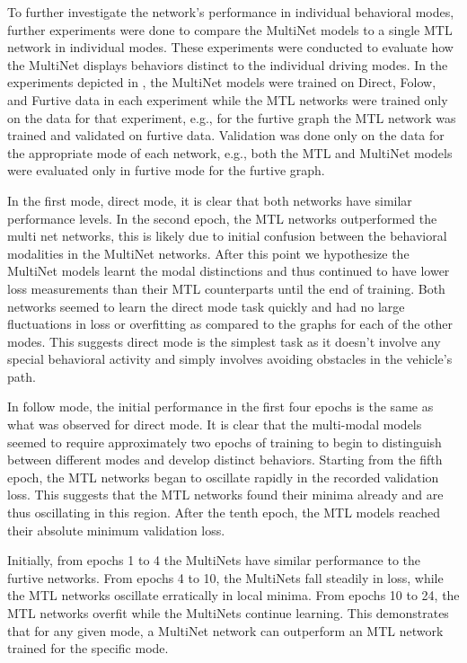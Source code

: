To further investigate the network's performance in individual behavioral modes, further experiments were done to compare the MultiNet models to a single MTL network in individual modes. These experiments were conducted to evaluate how the MultiNet displays behaviors distinct to the individual driving modes. In the experiments depicted in , the MultiNet models were trained on Direct, Folow, and Furtive data in each experiment while the MTL networks were trained only on the data for that experiment, e.g., for the furtive graph the MTL network was trained and validated on furtive data. Validation was done only on the data for the appropriate mode of each network, e.g., both the MTL and MultiNet models were evaluated only in furtive mode for the furtive graph.

In the first mode, direct mode, it is clear that both networks have similar performance levels. In the second epoch, the MTL networks outperformed the multi net networks, this is likely due to initial confusion between the behavioral modalities in the MultiNet networks. After this point we hypothesize the MultiNet models learnt the modal distinctions and thus continued to have lower loss measurements than their MTL counterparts until the end of training. Both networks seemed to learn the direct mode task quickly and had no large fluctuations in loss or overfitting as compared to the graphs for each of the other modes. This suggests direct mode is the simplest task as it doesn't involve any special behavioral activity and simply involves avoiding obstacles in the vehicle's path. 

In follow mode, the initial performance in the first four epochs is the same as what was observed for direct mode. It is clear that the multi-modal models seemed to require approximately two epochs of training to begin to distinguish between different modes and develop distinct behaviors. Starting from the fifth epoch, the MTL networks began to oscillate rapidly in the recorded validation loss. This suggests that the MTL networks found their minima already and are thus oscillating in this region. After the tenth epoch, the MTL models reached their absolute minimum validation loss.

Initially, from epochs 1 to 4 the MultiNets have similar performance to the furtive networks. From epochs 4 to 10, the MultiNets fall steadily in loss, while the MTL networks oscillate erratically in local minima. From epochs 10 to 24, the MTL networks overfit while the MultiNets continue learning. This demonstrates that for any given mode, a MultiNet network can outperform an MTL network trained for the specific mode.

